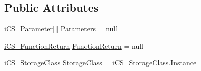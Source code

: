 \subsection*{Public Attributes}
\begin{DoxyCompactItemize}
\item 
\hyperlink{classi_c_s___parameter}{i\+C\+S\+\_\+\+Parameter}\mbox{[}$\,$\mbox{]} \hyperlink{classi_c_s___method_base_info_a970bc25d27a72f69512bf363022e04d9}{Parameters} = null
\item 
\hyperlink{classi_c_s___function_return}{i\+C\+S\+\_\+\+Function\+Return} \hyperlink{classi_c_s___method_base_info_a609b4b3792f67c838b26f1b7655bc18e}{Function\+Return} = null
\item 
\hyperlink{i_c_s___storage_class_8cs_a4e1bb1da155050e4b0d0118f813194aa}{i\+C\+S\+\_\+\+Storage\+Class} \hyperlink{classi_c_s___method_base_info_a4768afb99d42238e49309900a4853665}{Storage\+Class} = \hyperlink{i_c_s___storage_class_8cs_a4e1bb1da155050e4b0d0118f813194aaad9a17c1c9e8ef6866e4dbeef41c741b2}{i\+C\+S\+\_\+\+Storage\+Class.\+Instance}
\end{DoxyCompactItemize}
